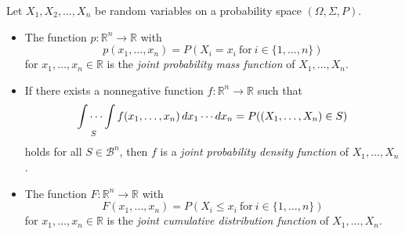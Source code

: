 \begin{definition}
  Let $X_1, X_2, \dots, X_n$ be random variables on a probability space
  $(\Omega, \Sigma, P)$.
  \begin{itemize}
    \item The function $p: \mathbb{R}^n \to \mathbb{R}$ with
      \begin{equation*}
        p(x_1, \dots, x_n)
        = P(X_i = x_i\ \text{for}\ i \in \{1, \dots, n\})
      \end{equation*}
      for $x_1, \dots, x_n \in \mathbb{R}$ is the
      \emph{joint probability mass function} of $X_1, \dots, X_n$.
    \item If there exists a nonnegative function
      $f: \mathbb{R}^n \to \mathbb{R}$ such that
      \begin{equation*}
        \idotsint\limits_S f(x_1, \dots, x_n)\,dx_1 \cdots dx_n
        = P((X_1, \dots, X_n) \in S)
      \end{equation*}
      holds for all $S \in \mathcal{B}^n$, then $f$ is a
      \emph{joint probability density function} of $X_1, \dots, X_n$.
    \item The function $F: \mathbb{R}^n \to \mathbb{R}$ with
      \begin{equation*}
        F(x_1, \dots, x_n)
        = P(X_i \leq x_i\ \text{for}\ i \in \{1, \dots, n\})
      \end{equation*}
      for $x_1, \dots, x_n \in \mathbb{R}$ is the
      \emph{joint cumulative distribution function} of $X_1, \dots, X_n$.
  \end{itemize}
\end{definition}